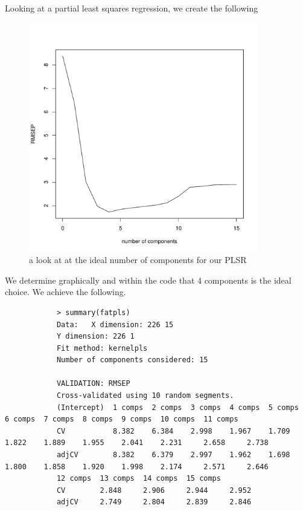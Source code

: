 \documentclass[11pt]{article}
\begin{document}
\begin{enumerate}
\begin{enumerate}
\begin{enumerate}
		Looking at a partial least squares regression, we create the following
			\begin{figure}[H]
				\centering
				\includegraphics[width=10cm,height=10cm]{114dc.pdf}
				\caption[paic]{a look at at the ideal number of components for our PLSR}
				\label{plsr}
			\end{figure}
		We determine graphically and within the code that 4 components is the ideal choice. We achieve the following.
		\begin{verbatim}
			> summary(fatpls)
			Data: 	X dimension: 226 15 
			Y dimension: 226 1
			Fit method: kernelpls
			Number of components considered: 15
			
			VALIDATION: RMSEP
			Cross-validated using 10 random segments.
			(Intercept)  1 comps  2 comps  3 comps  4 comps  5 comps  6 comps  7 comps  8 comps  9 comps  10 comps  11 comps
			CV           8.382    6.384    2.998    1.967    1.709    1.822    1.889    1.955    2.041    2.231     2.658     2.738
			adjCV        8.382    6.379    2.997    1.962    1.698    1.800    1.858    1.920    1.998    2.174     2.571     2.646
			12 comps  13 comps  14 comps  15 comps
			CV        2.848     2.906     2.944     2.952
			adjCV     2.749     2.804     2.839     2.846
			

\end{verbatim}
\end{enumerate}
\end{enumerate}
\end{enumerate}
\end{document}
